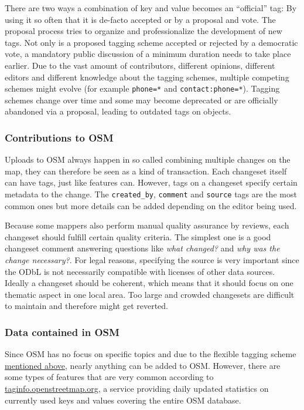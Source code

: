 			There are two ways a combination of key and value becomes an \enquote{official} tag:
			By using it so often that it is de-facto accepted or by a proposal and vote.
			The proposal process tries to organize and professionalize the development of new tags.
			Not only is a proposed tagging scheme accepted or rejected by a democratic vote, a mandatory public discussion of a minimum duration needs to take place earlier.
			Due to the vast amount of contributors, different opinions, different editors and different knowledge about the tagging schemes, multiple competing schemes might evolve (for example \texttt{phone=*} and \texttt{contact:phone=*}).
			Tagging schemes change over time and some may become deprecated or are officially abandoned via a proposal, leading to outdated tags on objects.
			
		\subsubsection{Contributions to OSM}
		
			Uploads to OSM always happen in so called  combining multiple changes on the map\cite{osm-wiki-changeset}, they can therefore be seen as a kind of transaction.
			Each changeset itself can have tags, just like features can.
			However, tags on a changeset specify certain metadata to the change.
			The \texttt{created\_by}, \texttt{comment} and \texttt{source} tags are the most common ones but more details can be added depending on the editor being used.
			
			Because some mappers also perform manual quality assurance by reviews, each changeset should fulfill certain quality criteria.
			The simplest one is a good changeset comment answering questions like \textit{what changed?} and \textit{why was the change necessary?}.
			For legal reasons, specifying the source is very important since the ODbL is not necessarily compatible with licenses of other data sources.
			Ideally a changeset should be coherent, which means that it should focus on one thematic aspect in one local area.
			Too large and crowded changesets are difficult to maintain and therefore might get reverted.
			
		\subsubsection{Data contained in OSM}
		
			Since OSM has no focus on specific topics and due to the flexible tagging scheme \hyperref[subsubsec:osm-attributes]{mentioned above}, nearly anything can be added to OSM.
			However, there are some types of features that are very common according to \href{https://taginfo.openstreetmap.org/keys}{taginfo.openstreetmap.org}, a service providing daily updated statistics on currently used keys and values covering the entire OSM database\cite{taginfo-keys}.
			
